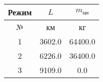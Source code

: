 \begin{tabular}{|c|c|c|}
\hline
Режим & $L$ & $m_{цн}$ \\ 
\hline
№ & км & кг \\ 
\hline
1 & 3602.0 & 64400.0 \\ 
\hline
2 & 6226.0 & 36400.0 \\ 
\hline
3 & 9109.0 & 0.0 \\ 
\hline
\end{tabular}